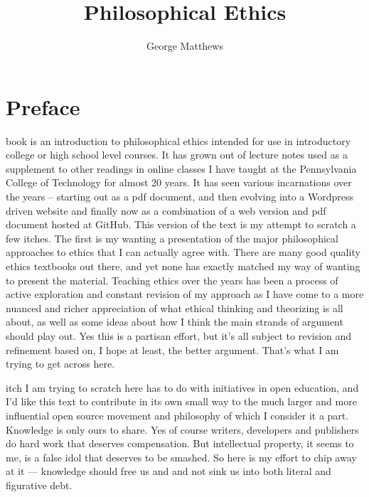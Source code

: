 \documentclass[justified]{tufte-book}
\title{Philosophical Ethics}
\author{George Matthews}
\date{}
\begin{document}
\maketitle



{
\setcounter{tocdepth}{1}
\tableofcontents
}

\hypertarget{preface}{%
\chapter*{Preface}\label{preface}}

 book is an introduction to philosophical ethics intended for use in introductory college or high school level courses. It has grown out of lecture notes used as a supplement to other readings in online classes I have taught at the Pennsylvania College of Technology for almost 20 years. It has seen various incarnations over the years -- starting out as a pdf document, and then evolving into a Wordpress driven website and finally now as a combination of a web version and pdf document hosted at GitHub. This version of the text is my attempt to scratch a few itches. The first is my wanting a presentation of the major philosophical approaches to ethics that I can actually agree with. There are many good quality ethics textbooks out there, and yet none has exactly matched my way of wanting to present the material. Teaching ethics over the years has been a process of active exploration and constant revision of my approach as I have come to a more nuanced and richer appreciation of what ethical thinking and theorizing is all about, as well as some ideas about how I think the main strands of argument should play out. Yes this is a partisan effort, but it's all subject to revision and refinement based on, I hope at least, the better argument. That's what I am trying to get across here.

 itch I am trying to scratch here has to do with initiatives in open education, and I'd like this text to contribute in its own small way to the much larger and more influential open source movement and philosophy of which I consider it a part. Knowledge is only ours to share. Yes of course writers, developers and publishers do hard work that deserves compensation. But intellectual property, it seems to me, is a false idol that deserves to be smashed. So here is my effort to chip away at it --- knowledge should free us and and not sink us into both literal and figurative debt.
\end{document}
